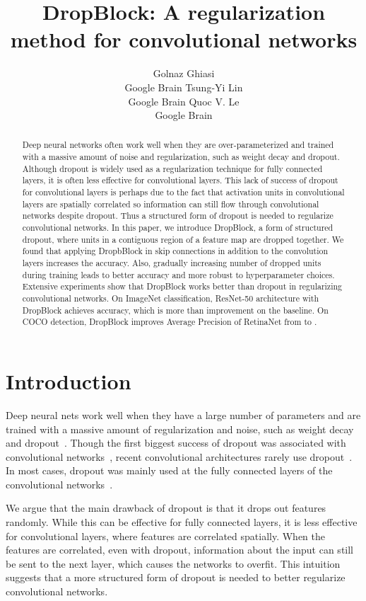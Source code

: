 \documentclass{article}
\title{DropBlock: A regularization method for convolutional networks}
\author{
  Golnaz Ghiasi \\ Google Brain
  \And
  Tsung-Yi Lin \\ Google Brain
  \And
  Quoc V. Le \\ Google Brain
}
\begin{document}
\maketitle

\begin{abstract}
  Deep neural networks often work well when they are over-parameterized and trained with a massive amount of noise and regularization, such as weight decay and dropout. Although dropout is widely used as a regularization technique for fully connected layers, it is often less effective for convolutional layers. This lack of success of dropout for convolutional layers is perhaps due to the fact that activation units in  convolutional layers are spatially correlated so information can still flow through convolutional networks despite dropout. Thus a structured form of dropout is needed to regularize convolutional networks. In this paper, we introduce DropBlock, a form of structured dropout, where units in a contiguous region of a feature map are dropped together. We found that applying DropbBlock in skip connections in addition to the convolution layers increases the accuracy. Also, gradually increasing number of dropped units during training leads to better accuracy and more robust to hyperparameter choices. Extensive experiments show that DropBlock works better than dropout in regularizing convolutional networks.
  On ImageNet classification, ResNet-50 architecture with DropBlock achieves  accuracy, which is more than  improvement on the baseline. On COCO detection, DropBlock improves Average Precision of RetinaNet from  to .
\end{abstract}


\section{Introduction}
Deep neural nets work well when they have a large number of parameters and are trained with a massive amount of regularization and noise, such as weight decay and dropout~\cite{dropout2014}. Though the first biggest success of dropout was associated with convolutional networks~\cite{krizhevsky2012imagenet}, recent convolutional architectures rarely use dropout~\cite{ioffe2015batch,he2016deep,szegedy2017inception,xie2017aggregated,han2017deep,zoph2017learning,hu2017squeeze,real2018regularized}. In most cases, dropout was mainly used at the fully connected layers of the convolutional networks~\cite{simonyan2014very,szegedy2015going,szegedy2016rethinking}.

We argue that the main drawback of dropout is that it drops out features randomly. While this can be effective for fully connected layers, it is less effective for convolutional layers, where features are correlated spatially. When the features are correlated, even with dropout, information about the input can still be sent to the next layer, which causes the networks to overfit. This intuition suggests that a more structured form of dropout is needed to better regularize convolutional networks.
\end{document}
